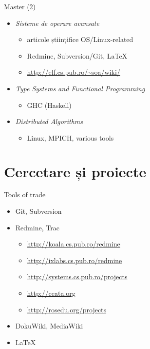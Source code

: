 \documentclass{beamer}
\begin{document}
\begin{frame}{Master (2)}
	\begin{itemize}
		\item \textit{Sisteme de operare avansate}
			\begin{itemize}
				\item articole științifice OS/Linux-related
				\item Redmine, Subversion/Git, \LaTeX
				\item \url{http://elf.cs.pub.ro/~soa/wiki/}
			\end{itemize}
		\item \textit{Type Systems and Functional Programming}
			\begin{itemize}
				\item GHC (Haskell)
			\end{itemize}
		\item \textit{Distributed Algorithms}
			\begin{itemize}
				\item Linux, MPICH, various tools
			\end{itemize}
	\end{itemize}
\end{frame}

\section{Cercetare și proiecte}

\frame{\tableofcontents[currentsection]}

\begin{frame}{Tools of trade}
	\begin{itemize}
		\item Git, Subversion
		\item Redmine, Trac
			\begin{itemize}
				\item \url{http://koala.cs.pub.ro/redmine}
				\item \url{http://ixlabs.cs.pub.ro/redmine}
				\item \url{http://systems.cs.pub.ro/projects}
				\item \url{http://ceata.org}
				\item \url{http://rosedu.org/projects}
			\end{itemize}
		\item DokuWiki, MediaWiki
		\item \LaTeX
	\end{itemize}
\end{frame}
\end{document}
